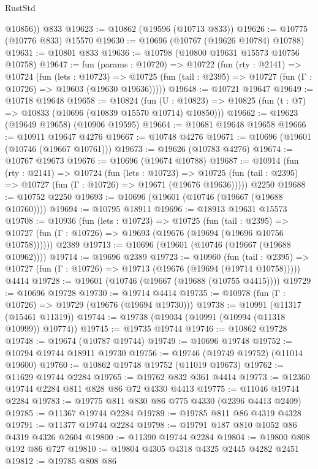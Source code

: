 \begin{lexlean}{RustStd}
\begin{coremodule}
        @10856))
    @833
@19623 := @10862 (@19596 (@10713 @833))
@19626 := @10775 (@10776 @833) @15570
@19630 := @10696 (@10767 (@19626 @10784) @10788)
@19631 := @10801 @833
@19636 := @10798 (@10800 @19631 @15573 @10756 @10758)
@19647 := fun (params : @10720) =>
  @10722
    (fun (rty : @2141) =>
    @10724
      (fun (lets : @10723) =>
      @10725 (fun (tail : @2395) => @10727 (fun (Γ : @10726) => @19603 (@19630 @19636)))))
@19648 := @10721 @19647
@19649 := @10718 @19648
@19658 := @10824
    (fun (U : @10823) => @10825 (fun (t : @7) => @10833 (@10696 (@10839 @15570 @10714) @10850)))
@19662 := @19623 (@19649 @19658) (@10906 @19595)
@19664 := @10681 @19648 @19658
@19666 := @10911 @19647 @4276
@19667 := @10748 @4276
@19671 := @10696 (@19601 (@10746 (@19667 @10761)))
@19673 := @19626 (@10783 @4276)
@19674 := @10767 @19673
@19676 := @10696 (@19674 @10788)
@19687 := @10914
    (fun (rty : @2141) =>
    @10724
      (fun (lets : @10723) =>
      @10725 (fun (tail : @2395) => @10727 (fun (Γ : @10726) => @19671 (@19676 @19636)))))
    @2250
@19688 := @10752 @2250
@19693 := @10696 (@19601 (@10746 (@19667 (@19688 @10760))))
@19694 := @10795 @18911
@19696 := @18913 @19631 @15573
@19708 := @10936
    (fun (lets : @10723) =>
    @10725
      (fun (tail : @2395) =>
      @10727 (fun (Γ : @10726) => @19693 (@19676 (@19694 (@19696 @10756 @10758))))))
    @2389
@19713 := @10696 (@19601 (@10746 (@19667 (@19688 @10962))))
@19714 := @19696 @2389
@19723 := @10960
    (fun (tail : @2395) => @10727 (fun (Γ : @10726) => @19713 (@19676 (@19694 (@19714 @10758)))))
    @4414
@19728 := @19601 (@10746 (@19667 (@19688 (@10755 @4415))))
@19729 := @10696 @19728
@19730 := @19714 @4414
@19735 := @10978 (fun (Γ : @10726) => @19729 (@19676 (@19694 @19730)))
@19738 := @10991 (@11317 (@15461 @11319))
@19744 := @19738 (@19034 (@10991 (@10994 (@11318 @10999)) @10774))
@19745 := @19735 @19744
@19746 := @10862 @19728
@19748 := @19674 (@10787 @19744)
@19749 := @10696 @19748
@19752 := @10794 @19744 @18911 @19730
@19756 := @19746 (@19749 @19752) (@11014 @19600)
@19760 := @10862 @19748 @19752 (@11019 @19673)
@19762 := @11629 @19744 @2284
@19765 := @19762 @832 @361 @4414
@19773 := @12360 @19744 @2284 @811 @828 @86 @72 @4330 @4413
@19775 := @11046 @19744 @2284
@19783 := @19775 @811 @830 @86 @775 @4330 (@2396 @4413 @2409)
@19785 := @11367 @19744 @2284
@19789 := @19785 @811 @86 @4319 @4328
@19791 := @11377 @19744 @2284
@19798 := @19791 @187 @810 @1052 @86 @4319 @4326 @2604
@19800 := @11390 @19744 @2284
@19804 := @19800 @808 @192 @86 @727
@19810 := @19804 @4305 @4318 @4325 @2445 @4282 @2451
@19812 := @19785 @808 @86

\end{coremodule}
\end{lexlean}
